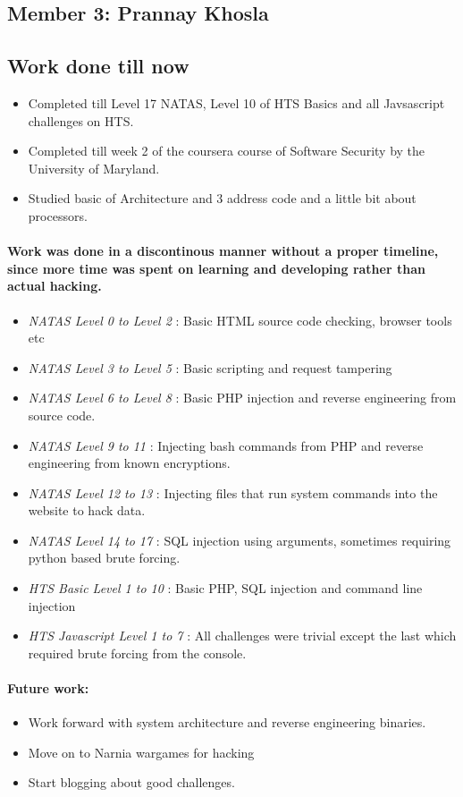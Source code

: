 \documentclass{article}
\begin{document}
\begin{itemize}
\newpage
\section*{Member 3: Prannay Khosla}
\subsection*{Work done till now}
\begin{itemize}
	\item Completed till Level 17 NATAS, Level 10 of HTS Basics and all Javsascript challenges on HTS.
	\item Completed till week 2 of the coursera course of Software Security by the  University of Maryland. 
	\item Studied basic of Architecture and 3 address code and a little bit about processors.
\end{itemize}
\paragraph{Work was done in a discontinous manner without a proper timeline, since more time was spent on learning and developing rather than actual hacking.}
\begin{itemize}
	\item \textit{NATAS Level 0 to Level 2} : Basic HTML source code checking, browser tools etc
	\item \textit{NATAS Level 3 to Level 5} : Basic scripting and request tampering
	\item \textit{NATAS Level 6 to Level 8} : Basic PHP injection and reverse engineering from source code. 
	\item \textit{NATAS Level 9 to 11} : Injecting bash commands from PHP and reverse engineering from known encryptions.
	\item \textit{NATAS Level 12 to 13} :  Injecting files that run system commands into the website to hack data. 
	\item \textit{NATAS Level 14 to 17} : SQL injection using arguments, sometimes requiring python based brute forcing. 
	\item \textit{HTS Basic Level 1 to 10} : Basic PHP, SQL injection and command line injection
	\item \textit{HTS Javascript Level 1 to 7} : All challenges were trivial except the last which required brute forcing from the console. 
\end{itemize}

\paragraph{Future work:}
\begin{itemize}
	\item Work forward with system architecture and reverse engineering binaries.
	\item Move on to Narnia wargames for hacking
	\item Start blogging about good challenges.
\end{itemize}



\end{itemize}
\end{document}
